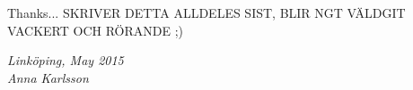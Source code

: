 \begin{acknowledgments}
  Thanks... SKRIVER DETTA ALLDELES SIST, BLIR NGT VÄLDGIT VACKERT OCH RÖRANDE ;)

  \addvspace{1em}
  \begin{flushright}
    \textit{%
      Linköping, May 2015\\
      Anna Karlsson%
    }
  \end{flushright}
\end{acknowledgments}
